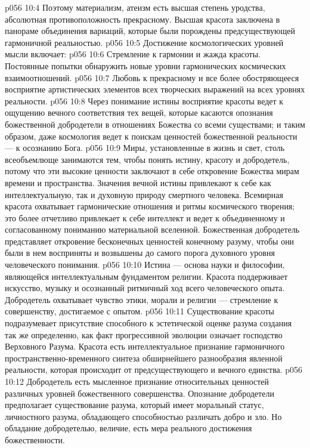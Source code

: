 \vs p056 10:4 Поэтому материализм, атеизм есть высшая степень уродства, абсолютная противоположность прекрасному. Высшая красота заключена в панораме объединения вариаций, которые были порождены предсуществующей гармоничной реальностью.
\vs p056 10:5 Достижение космологических уровней мысли включает:
\vs p056 10:6 \bibnobreakspace {} Стремление к гармонии и жажда красоты. Постоянные попытки обнаружить новые уровни гармонических космических взаимоотношений.
\vs p056 10:7 \pc {}\bibnobreakspace {} Любовь к прекрасному и все более обостряющееся восприятие артистических элементов всех творческих выражений на всех уровнях реальности.
\vs p056 10:8 \pc {}\bibnobreakspace {} Через понимание истины восприятие красоты ведет к ощущению вечного соответствия тех вещей, которые касаются опознания божественной добродетели в отношениях Божества со всеми существами; и таким образом, даже космология ведет к поискам ценностей божественной реальности --- к осознанию Бога.
\vs p056 10:9 \pc Миры, установленные в жизнь и свет, столь всеобъемлюще занимаются тем, чтобы понять истину, красоту и добродетель, потому что эти высокие ценности заключают в себе откровение Божества мирам времени и пространства. Значения вечной истины привлекают к себе как интеллектуальную, так и духовную природу смертного человека. Всемирная красота охватывает гармонические отношения и ритмы космического творения; это более отчетливо привлекает к себе интеллект и ведет к объединенному и согласованному пониманию материальной вселенной. Божественная добродетель представляет откровение бесконечных ценностей конечному разуму, чтобы они были в нем восприняты и возвышены до самого порога духовного уровня человеческого понимания.
\vs p056 10:10 Истина --- основа науки и философии, являющейся интеллектуальным фундаментом религии. Красота поддерживает искусство, музыку и осознанный ритмичный ход всего человеческого опыта. Добродетель охватывает чувство этики, морали и религии --- стремление к совершенству, достигаемое с опытом.
\vs p056 10:11 Существование красоты подразумевает присутствие способного к эстетической оценке разума создания так же определенно, как факт прогрессивной эволюции означает господство Верховного Разума. Красота есть интеллектуальное признание гармоничного пространственно\hyp{}временного синтеза обширнейшего разнообразия явленной реальности, которая происходит от предсуществующего и вечного единства.
\vs p056 10:12 Добродетель есть мысленное признание относительных ценностей различных уровней божественного совершенства. Опознание добродетели предполагает существование разума, который имеет моральный статус, личностного разума, обладающего способностью различать добро и зло. Но обладание добродетелью, величие, есть мера реального достижения божественности.
